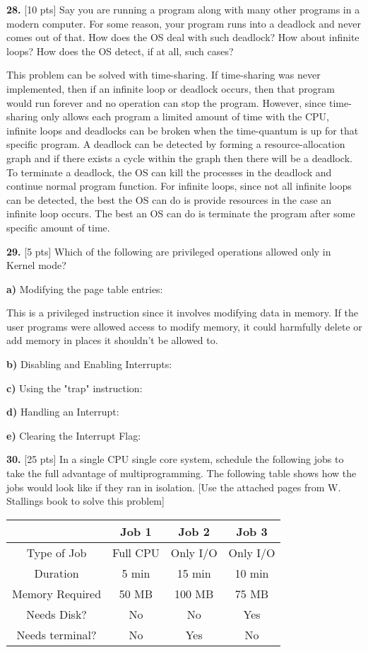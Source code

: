 \documentclass[12pt]{article}
\begin{document}
\bigskip

{\bf 28.} [10 pts] Say you are running a program along with many other programs in a modern computer. For some reason, your program runs into a deadlock and never comes out of that. How does the OS deal with such deadlock? How about infinite loops? How does the OS detect, if at all, such cases?

This problem can be solved with time-sharing. If time-sharing was never implemented, then if an infinite loop or deadlock occurs, then that program would run forever and no operation can stop the program. However, since time-sharing only allows each program a limited amount of time with the CPU, infinite loops and deadlocks can be broken when the time-quantum is up for that specific program. A deadlock can be detected by forming a resource-allocation graph and if there exists a cycle within the graph then there will be a deadlock. To terminate a deadlock, the OS can kill the processes in the deadlock and continue normal program function. For infinite loops, since not all infinite loops can be detected, the best the OS can do is provide resources in the case an infinite loop occurs. The best an OS can do is terminate the program after some specific amount of time. 

\bigskip

{\bf 29.} [5 pts] Which of the following are privileged operations allowed only in Kernel mode?

{\bf a)}	Modifying the page table entries:	

This is a privileged instruction since it involves modifying data in memory. If the user programs were allowed access to modify memory, it could harmfully delete or add memory in places it shouldn't be allowed to. 

{\bf b)} Disabling and Enabling Interrupts:

{\bf c)} Using the "trap" instruction:

{\bf d)} Handling an Interrupt:

{\bf e)} Clearing the Interrupt Flag:

\bigskip

{\bf 30.} [25 pts] In a single CPU single core system, schedule the following jobs to take the full advantage of multiprogramming. The following table shows how the jobs would look like if they ran in isolation. [Use the attached pages from W. Stallings book to solve this problem]

\begin{center}
\begin{tabular}{| c || c | c | c |}
\hline
& Job 1 & Job 2 & Job 3\\
\hline\hline
Type of Job & Full CPU & Only I/O & Only I/O\\
\hline
Duration & 5 min & 15 min & 10 min\\
\hline
Memory Required & 50 MB & 100 MB & 75 MB\\
\hline
Needs Disk? & No & No & Yes\\
\hline
Needs terminal? & No & Yes & No\\
\hline
\end{tabular}
\end{center}
\end{document}
